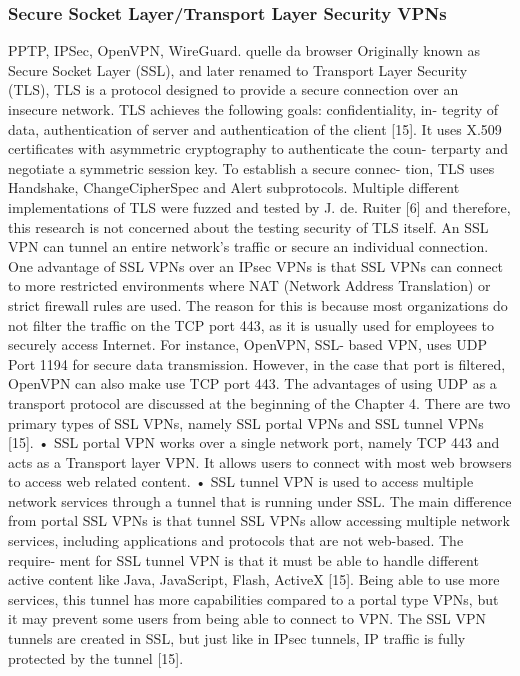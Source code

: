 \subsubsection{Secure Socket Layer/Transport Layer Security VPNs}
PPTP, IPSec, OpenVPN, WireGuard. quelle da browser
Originally known as Secure Socket Layer (SSL), and later renamed to Transport Layer Security (TLS), TLS is a protocol designed to provide a secure connection over an insecure network. TLS achieves the following goals: confidentiality, in- tegrity of data, authentication of server and authentication of the client [15]. It uses X.509 certificates with asymmetric cryptography to authenticate the coun- terparty and negotiate a symmetric session key. To establish a secure connec- tion, TLS uses Handshake, ChangeCipherSpec and Alert subprotocols. Multiple different implementations of TLS were fuzzed and tested by J. de. Ruiter [6] and therefore, this research is not concerned about the testing security of TLS itself.
An SSL VPN can tunnel an entire network’s traffic or secure an individual connection. One advantage of SSL VPNs over an IPsec VPNs is that SSL VPNs can connect to more restricted environments where NAT (Network Address Translation) or strict firewall rules are used. The reason for this is because most organizations do not filter the traffic on the TCP port 443, as it is usually used for employees to securely access Internet. For instance, OpenVPN, SSL- based VPN, uses UDP Port 1194 for secure data transmission. However, in the case that port is filtered, OpenVPN can also make use TCP port 443. The advantages of using UDP as a transport protocol are discussed at the beginning of the Chapter 4.
There are two primary types of SSL VPNs, namely SSL portal VPNs and SSL tunnel VPNs [15].
• SSL portal VPN works over a single network port, namely TCP 443 and acts as a Transport layer VPN. It allows users to connect with most web browsers to access web related content.
• SSL tunnel VPN is used to access multiple network services through a tunnel that is running under SSL. The main difference from portal SSL VPNs is that tunnel SSL VPNs allow accessing multiple network services, including applications and protocols that are not web-based. The require- ment for SSL tunnel VPN is that it must be able to handle different active content like Java, JavaScript, Flash, ActiveX [15]. Being able to use more services, this tunnel has more capabilities compared to a portal type VPNs, but it may prevent some users from being able to connect to VPN. The SSL VPN tunnels are created in SSL, but just like in IPsec tunnels, IP traffic is fully protected by the tunnel [15].

